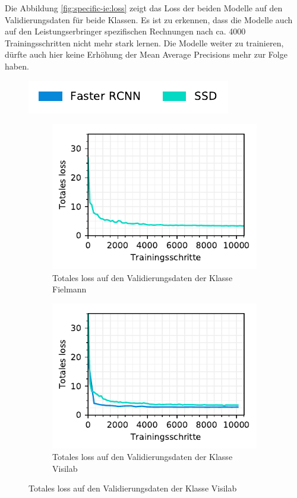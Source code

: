 Die Abbildung \ref{fig:specific-ie:loss} zeigt das Loss der beiden Modelle auf den Validierungsdaten für beide Klassen. Es ist zu erkennen, dass die Modelle auch auf den Leistungserbringer spezifischen Rechnungen nach ca. 4000 Trainingsschritten nicht mehr stark lernen. Die Modelle weiter zu trainieren, dürfte auch hier keine Erhöhung der Mean Average Precisions mehr zur Folge haben.

\begin{figure}[h!] 
  \captionsetup{width=.9\linewidth}
  \label{fig:specific-ie:loss}
  \caption{TODO}
  \centering
  \includegraphics[scale=1]{graphics/matplot/img-detection__legend_1.pdf}
  \begin{subfigure}[b]{0.45\linewidth}
    \centering
    \includegraphics[scale=1]{graphics/matplot/img-detection__fielmann__loss.pdf}
    \caption{Totales loss auf den Validierungsdaten der Klasse Fielmann} 
    \label{fig:specific-ie:visilab:loss}
    \vspace{2ex}
  \end{subfigure}%
  \begin{subfigure}[b]{0.45\linewidth}
    \centering
    \includegraphics[scale=1]{graphics/matplot/img-detection__visilab__loss.pdf}
    \caption{Totales loss auf den Validierungsdaten der Klasse Visilab} 
    \label{fig:specific-ie:visilab:loss}
    \vspace{2ex}
  \end{subfigure} 
\end{figure}

